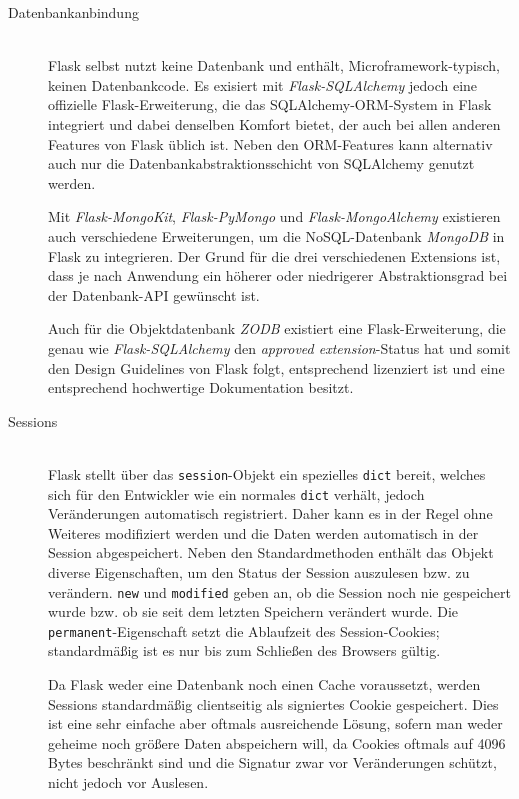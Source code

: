 \begin{description}
\item[Datenbankanbindung] \hfill \\
Flask selbst nutzt keine Datenbank und enthält, Microframework-typisch, keinen Datenbankcode. Es
exisiert mit \emph{Flask-SQLAlchemy} jedoch eine offizielle Flask-Erweiterung, die das
SQLAlchemy-ORM-System in Flask integriert und dabei denselben Komfort bietet, der auch bei allen
anderen Features von Flask üblich ist. Neben den ORM-Features kann alternativ auch nur die
Datenbankabstraktionsschicht von SQLAlchemy genutzt werden.

Mit \emph{Flask-MongoKit}, \emph{Flask-PyMongo} und \emph{Flask-MongoAlchemy} existieren auch
verschiedene Erweiterungen, um die NoSQL-Datenbank \emph{MongoDB} in Flask zu integrieren. Der Grund
für die drei verschiedenen Extensions ist, dass je nach Anwendung ein höherer oder niedrigerer
Abstraktionsgrad bei der Datenbank-API gewünscht ist.

Auch für die Objektdatenbank \emph{ZODB} existiert eine Flask-Erweiterung, die genau wie
\emph{Flask-SQLAlchemy} den \emph{approved extension}-Status hat und somit den Design Guidelines von
Flask folgt, entsprechend lizenziert ist und eine entsprechend hochwertige Dokumentation besitzt.


\item[Sessions] \hfill \\
Flask stellt über das \lstinline{session}-Objekt ein spezielles \lstinline{dict} bereit, welches
sich für den Entwickler wie ein normales \lstinline{dict} verhält, jedoch Veränderungen automatisch
registriert. Daher kann es in der Regel ohne Weiteres modifiziert werden und die Daten werden
automatisch in der Session abgespeichert. Neben den Standardmethoden enthält das Objekt diverse
Eigenschaften, um den Status der Session auszulesen bzw. zu verändern. \lstinline{new} und
\lstinline{modified} geben an, ob die Session noch nie gespeichert wurde bzw. ob sie seit dem
letzten Speichern verändert wurde. Die \lstinline{permanent}-Eigenschaft setzt die Ablaufzeit des
Session-Cookies; standardmäßig ist es nur bis zum Schließen des Browsers gültig.

Da Flask weder eine Datenbank noch einen Cache voraussetzt, werden Sessions standardmäßig
clientseitig als signiertes Cookie gespeichert. Dies ist eine sehr einfache aber oftmals
ausreichende Lösung, sofern man weder geheime noch größere Daten abspeichern will, da Cookies
oftmals auf 4096 Bytes beschränkt sind und die Signatur zwar vor Veränderungen schützt, nicht jedoch
vor Auslesen.


\end{description}
